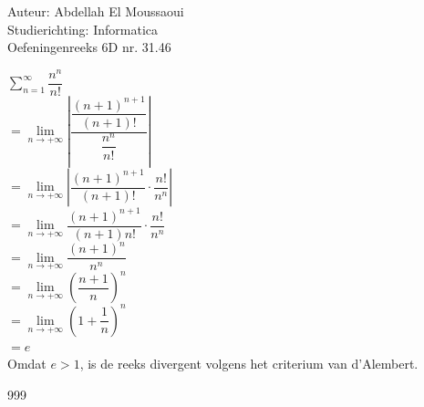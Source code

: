 \documentclass[a4paper]{article}
\begin{document}
  
\noindent \large Auteur: Abdellah El Moussaoui \\
\noindent \large Studierichting: Informatica\\
\noindent \large Oefeningenreeks 6D nr. 31.46\\

\medskip

\normalsize

$\displaystyle\sum_{n=1}^{\infty} \dfrac{n^n}{n!}$\\

$ = \lim\limits_{n\to+\infty} \left| \dfrac{\dfrac{\left(n+1\right)^{n+1}}{\left(n+1\right)!}}{\dfrac{n^n}{n!}} \right|$\\

$ = \lim\limits_{n\to+\infty} \left| \dfrac{\left(n+1\right)^{n+1}}{\left(n+1\right)!}\cdot\dfrac{n!}{n^n} \right|$\\

$ = \lim\limits_{n\to+\infty} \dfrac{\left(n+1\right)^{n+1}}{\left(n+1\right)n!}\cdot\dfrac{n!}{n^n}$\\

$= \lim\limits_{n\to+\infty} \dfrac{\left(n+1\right)^n}{n^n}$\\

$= \lim\limits_{n\to+\infty} \left(\dfrac{n+1}{n}\right)^n$\\

$ = \lim\limits_{n\to+\infty} \left(1+\dfrac{1}{n}\right)^n$\\

$ = e$\\

Omdat $e>1$, is de reeks divergent volgens het criterium van d'Alembert.\\

\begin{thebibliography}{999}
\end{thebibliography}
\end{document}
